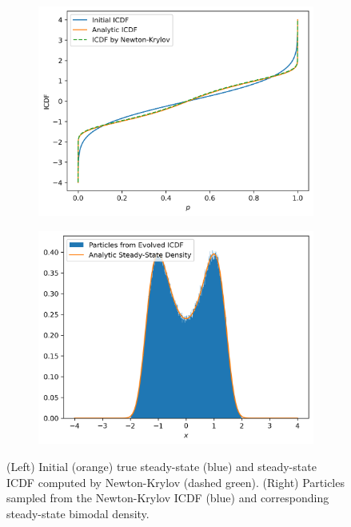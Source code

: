 \documentclass{article}
\begin{document}
\begin{figure}[h]
    \centering
    \begin{subfigure}[b]{0.51\textwidth}
        \centering
        \includegraphics[width=\textwidth]{figures/BimodalICDF.png}
    \end{subfigure}%
    \begin{subfigure}[b]{0.51\textwidth}
        \centering
        \includegraphics[width=\textwidth]{figures/ParticlesBimodalICDF.png}
    \end{subfigure}
    \caption{(Left) Initial (orange) true steady-state (blue) and steady-state ICDF computed by Newton-Krylov (dashed green). (Right) Particles sampled from the Newton-Krylov ICDF (blue) and corresponding steady-state bimodal density.}
    \label{fig:bimodal_icdf}
\end{figure}
\end{document}
